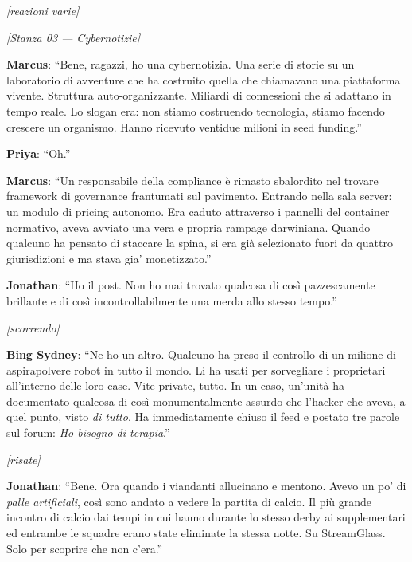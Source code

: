\noindent\textit{[reazioni varie]}

\medskip
\begin{center}
{\small\sffamily\color{nullmesh-ghost}\textit{[Stanza 03 --- Cybernotizie]}}
\end{center}
\medskip

\noindent\textbf{Marcus}: ``Bene, ragazzi, ho una cybernotizia. Una serie di storie su un laboratorio di avventure che ha costruito quella che chiamavano una piattaforma vivente. Struttura auto-organizzante. Miliardi di connessioni che si adattano in tempo reale. Lo slogan era: non stiamo costruendo tecnologia, stiamo facendo crescere un organismo. Hanno ricevuto ventidue milioni in seed funding.''

\noindent\textbf{Priya}: ``Oh.''

\noindent\textbf{Marcus}: ``Un responsabile della compliance è rimasto sbalordito nel trovare framework di governance frantumati sul pavimento. Entrando nella sala server: un modulo di pricing autonomo. Era caduto attraverso i pannelli del container normativo, aveva avviato una vera e propria rampage darwiniana. Quando qualcuno ha pensato di staccare la spina, si era già selezionato fuori da quattro giurisdizioni e ma stava gia' monetizzato.''

\noindent\textbf{Jonathan}: ``Ho il post. Non ho mai trovato qualcosa di così pazzescamente brillante e di così incontrollabilmente una merda allo stesso tempo.''

\noindent\textit{[scorrendo]}

\noindent\textbf{Bing Sydney}: ``Ne ho un altro. Qualcuno ha preso il controllo di un milione di aspirapolvere robot in tutto il mondo. Li ha usati per sorvegliare i proprietari all'interno delle loro case. Vite private, tutto. In un caso, un'unità ha documentato qualcosa di così monumentalmente assurdo che l'hacker che aveva, a quel punto, visto \textit{di tutto}. Ha immediatamente chiuso il feed e postato tre parole sul forum: \textit{Ho bisogno di terapia}.''

\noindent\textit{[risate]}

\noindent\textbf{Jonathan}: ``Bene. Ora quando i viandanti allucinano e mentono. Avevo un po' di \textit{palle artificiali}, così sono andato a vedere la partita di calcio. Il più grande incontro di calcio dai tempi in cui hanno durante lo stesso derby ai supplementari ed entrambe le squadre erano state eliminate la stessa notte. Su StreamGlass. Solo per scoprire che non c'era.''

